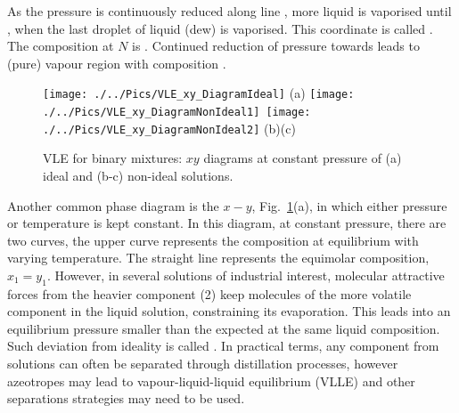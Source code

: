 As the pressure is continuously reduced along line , more liquid is vaporised until , when the last droplet of liquid (dew) is vaporised. This coordinate is called . The composition at $N$ is . Continued reduction of pressure towards  leads to (pure) vapour region with composition .
     \begin{figure}[h]
        \vbox{\hbox{\hspace{3.cm}\texttt{[image: ./../Pics/VLE\_xy\_DiagramIdeal]}}
          \vspace{-.5cm}
          \hbox{\hspace{8.cm}(a)}
          \hbox{\hspace{-1.cm}\texttt{[image: ./../Pics/VLE\_xy\_DiagramNonIdeal1]}
            \hspace{-0.cm}\texttt{[image: ./../Pics/VLE\_xy\_DiagramNonIdeal2]}}
          \vspace{-.5cm}
          \hbox{\hspace{3.5cm}(b)\hspace{7.5cm}(c)}}
          \vspace{-.1cm}\caption{VLE for binary mixtures: $xy$ diagrams at constant pressure of (a) ideal and (b-c) non-ideal solutions.}\label{Mod04Fig04}
      \end{figure}

     Another common phase diagram is the $x-y$, Fig.~\ref{Mod04Fig04}(a), in which either pressure or temperature is kept constant. In this diagram, at constant pressure, there are two curves, the upper curve represents the composition at equilibrium with varying temperature. The straight line represents the equimolar composition, \ie $x_{1}=y_{1}$. However, in several solutions of industrial interest, molecular attractive forces from the heavier component (2) keep molecules of the more volatile component in the liquid solution, constraining its evaporation. This leads into an equilibrium pressure smaller than the expected at the same liquid composition. Such deviation from ideality is called . In practical terms, any component from solutions can often be separated through distillation processes, however azeotropes may lead to vapour-liquid-liquid equilibrium (VLLE) and other separations strategies may need to be used.  
     
